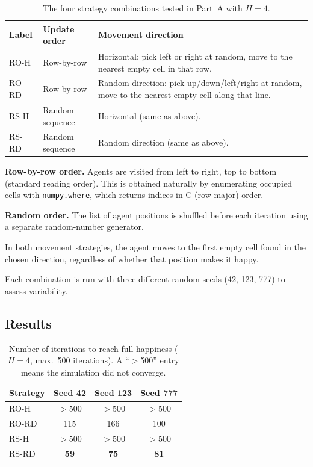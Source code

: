 \documentclass[11pt, a4paper]{article}
\begin{document}
\begin{table}[H]
  \centering
  \caption{The four strategy combinations tested in Part~A with $H = 4$.}
  \label{tab:combos}
  \begin{tabular}{p{1.5cm} p{3.5cm} p{7cm}}
    \toprule
    Label  & Update order      & Movement direction \\
    \midrule
    RO-H   & Row-by-row        & Horizontal: pick left or right at random, move to
                                 the nearest empty cell in that row. \\[4pt]
    RO-RD  & Row-by-row        & Random direction: pick up/down/left/right at random,
                                 move to the nearest empty cell along that line. \\[4pt]
    RS-H   & Random sequence   & Horizontal (same as above). \\[4pt]
    RS-RD  & Random sequence   & Random direction (same as above). \\
    \bottomrule
  \end{tabular}
\end{table}

\textbf{Row-by-row order.} Agents are visited from left to right, top to bottom (standard
reading order). This is obtained naturally by enumerating occupied cells with
\texttt{numpy.where}, which returns indices in C (row-major) order.

\textbf{Random order.} The list of agent positions is shuffled before each iteration
using a separate random-number generator.

In both movement strategies, the agent moves to the first empty cell found in the chosen
direction, regardless of whether that position makes it happy.

Each combination is run with three different random seeds (42, 123, 777) to assess
variability.

\subsection{Results}

\begin{table}[H]
  \centering
  \caption{Number of iterations to reach full happiness ($H = 4$, max.\ 500 iterations).
  A ``$>$500'' entry means the simulation did not converge.}
  \label{tab:results_a}
  \begin{tabular}{lccc}
    \toprule
    Strategy & Seed 42 & Seed 123 & Seed 777 \\
    \midrule
    RO-H  & $>500$ & $>500$ & $>500$ \\
    RO-RD & 115    & 166    & 100    \\
    RS-H  & $>500$ & $>500$ & $>500$ \\
    RS-RD & \textbf{59}  & \textbf{75}  & \textbf{81}  \\
    \bottomrule
  \end{tabular}
\end{table}
\end{document}
